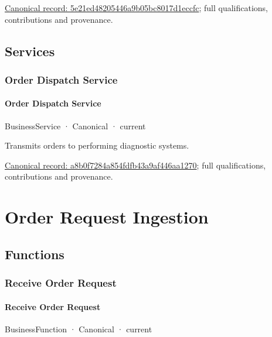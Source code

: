 {\footnotesize \href{../../../../continuum/business/business-function/5e21ed48205446a9b05bc8017d1eccfc.md}{Canonical record: 5e21ed48205446a9b05bc8017d1eccfc}; full qualifications, contributions and provenance.}\par
\subsection{Services}

\subsubsection{Order Dispatch Service}

\paragraph{Order Dispatch Service}

\label{element:a8b0f7284a854fdfb43a9af446aa1270}
{\small BusinessService · Canonical · current}\par

Transmits orders to performing diagnostic systems.


{\footnotesize \href{../../../../continuum/business/business-service/a8b0f7284a854fdfb43a9af446aa1270.md}{Canonical record: a8b0f7284a854fdfb43a9af446aa1270}; full qualifications, contributions and provenance.}\par
\section{Order Request Ingestion}

\subsection{Functions}

\subsubsection{Receive Order Request}

\paragraph{Receive Order Request}

\label{element:e5387fca59324407b8ed5d6db66ef93b}
{\small BusinessFunction · Canonical · current}\par

